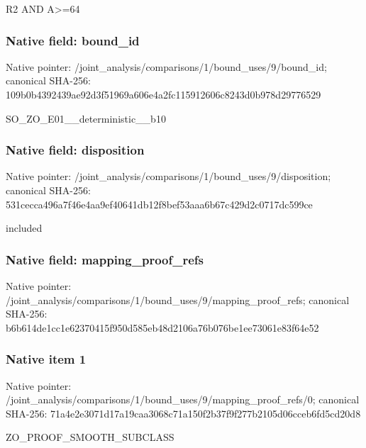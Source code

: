 \documentclass[10pt,a4paper]{article}
\begin{document}
\begingroup\raggedright\sloppy R2 AND A>=\allowbreak{}64\par\endgroup

\subsubsection{Native field: bound\_\allowbreak{}id}
Native pointer: /joint\_\allowbreak{}analysis/comparisons/1/bound\_\allowbreak{}uses/9/bound\_\allowbreak{}id; canonical SHA-256: 109b0b4392439ae92d3f51969a606e4a2fc115912606c8243d0b978d29776529

\begingroup\raggedright\sloppy SO\_\allowbreak{}ZO\_\allowbreak{}E01\_\allowbreak{}\_\allowbreak{}deterministic\_\allowbreak{}\_\allowbreak{}b10\par\endgroup

\subsubsection{Native field: disposition}
Native pointer: /joint\_\allowbreak{}analysis/comparisons/1/bound\_\allowbreak{}uses/9/disposition; canonical SHA-256: 531cecca496a7f46e4aa9ef40641db12f8bef53aaa6b67c429d2c0717dc599ce

\begingroup\raggedright\sloppy included\par\endgroup

\subsubsection{Native field: mapping\_\allowbreak{}proof\_\allowbreak{}refs}
Native pointer: /joint\_\allowbreak{}analysis/comparisons/1/bound\_\allowbreak{}uses/9/mapping\_\allowbreak{}proof\_\allowbreak{}refs; canonical SHA-256: b6b614de1cc1e62370415f950d585eb48d2106a76b076be1ee73061e83f64e52

\subsubsection{Native item 1}
Native pointer: /joint\_\allowbreak{}analysis/comparisons/1/bound\_\allowbreak{}uses/9/mapping\_\allowbreak{}proof\_\allowbreak{}refs/0; canonical SHA-256: 71a4e2e3071d17a19caa3068c71a150f2b37f9f277b2105d06cceb6fd5cd20d8

\begingroup\raggedright\sloppy ZO\_\allowbreak{}PROOF\_\allowbreak{}SMOOTH\_\allowbreak{}SUBCLASS\par\endgroup
\end{document}

